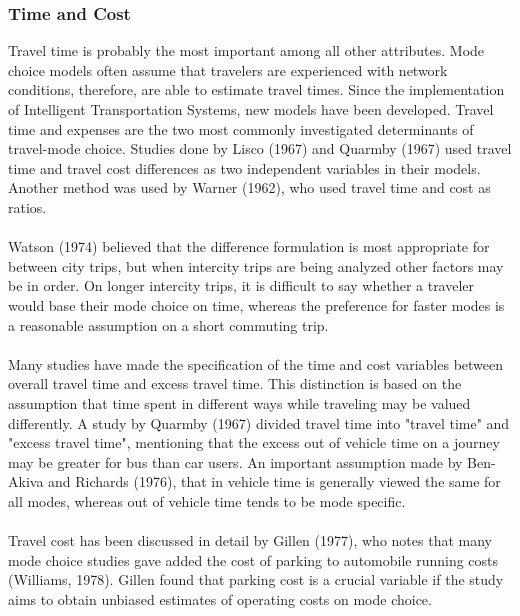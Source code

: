 \subsubsection*{Time and Cost}
Travel time is probably the most important among all other attributes. Mode choice models often assume that travelers are experienced with network conditions, therefore, are able to estimate travel times. Since the implementation of Intelligent Transportation Systems, new models have been developed.
Travel time and expenses are the two most commonly investigated determinants of travel-mode choice. Studies done by Lisco (1967) and Quarmby (1967) used travel time and travel cost differences as two independent variables in their models. Another method was used by Warner (1962), who used travel time and cost as ratios.
\paragraph{}Watson (1974) believed that the difference formulation is most appropriate for between city trips, but when intercity trips are being analyzed other factors may be in order. On longer intercity trips, it is difficult to say whether a traveler would base their mode choice on time, whereas the preference for faster modes is a reasonable assumption on a short commuting trip. 
\paragraph{}Many studies have made the specification of the time and cost variables between overall travel time and excess travel time. This distinction is based on the assumption that time spent in different ways while traveling may be valued differently. A study by Quarmby (1967) divided travel time into "travel time" and "excess travel time", mentioning that the excess out of vehicle time on a journey may be greater for bus than car users. An important assumption made by Ben-Akiva and Richards (1976), that in vehicle time is generally viewed the same for all modes, whereas out of vehicle time tends to be mode  specific. 
\paragraph{}Travel cost has been discussed in detail by Gillen (1977), who notes that many mode choice studies gave added the cost of parking to automobile running costs (Williams, 1978). Gillen found that parking cost is a  crucial variable if the study aims to obtain unbiased estimates of operating costs on mode choice. 
